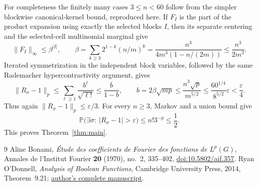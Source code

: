 \documentclass[11pt]{article}
\newcommand{\Prob}{\mathbb P}
\begin{document}
For completeness the finitely many cases $3\leq n<60$ follow from the
simpler blockwise canonical-kernel bound, reproduced here. If $F_I$ is the
part of the product expansion using exactly the selected blocks $I$, then
its separate centering and the selected-cell multinomial marginal give
\[
 \|F_I\|_\infty\leq\beta^{|I|},\qquad
 \beta=\sum_{k\geq3}2^{1-k}(n/m)^k
      =\frac{n^3}{4m^3(1-n/(2m))}\leq\frac{n^3}{2m^3}.
\]
Iterated symmetrization in the independent block variables, followed by
the same Rademacher hypercontractivity argument, gives
\[
 \|R_\sigma-1\|_p\leq
 \sum_{\ell\geq1}\frac{b^\ell}{\sqrt{\ell!}}
 \leq\frac b{1-b},\qquad
 b=2\beta\sqrt{mp}\leq\frac{n^3\sqrt p}{m^{5/2}}
 \leq\frac{60^{1/4}}{8^{5/2}}\varepsilon<\frac\varepsilon4.
\]
Thus again $\|R_\sigma-1\|_p\leq\varepsilon/3$.
For every $n\geq3$, Markov and a union bound give
\[
 \Prob\bigl(\exists\sigma:\ |R_\sigma-1|>\varepsilon\bigr)
 \leq n!3^{-p}\leq\frac12.
\]
This proves Theorem~\ref{thm:main}.

\begin{thebibliography}{9}
 Aline Bonami, \emph{\'Etude des coefficients de Fourier des fonctions de $L^p(G)$}, Annales de l'Institut Fourier \textbf{20} (1970), no.~2, 335--402, \href{https://aif.centre-mersenne.org/item/AIF_1970__20_2_335_0/}{doi:10.5802/aif.357}.
 Ryan O'Donnell, \emph{Analysis of Boolean Functions}, Cambridge University Press, 2014, Theorem~9.21; \href{https://www.cs.cmu.edu/~odonnell/papers/Analysis-of-Boolean-Functions-by-Ryan-ODonnell.pdf}{author's complete manuscript}.
\end{thebibliography}
\end{document}
